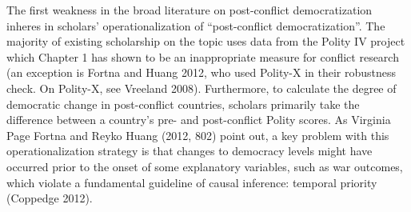 \documentclass [11pt]{article}
\begin{document}


The first weakness in the broad literature on post-conflict democratization inheres in scholars' operationalization of ``post-conflict democratization''. The majority of existing scholarship on the topic uses data from the Polity IV project which Chapter 1 has shown to be an inappropriate measure for conflict research (an exception is Fortna and Huang 2012, who used Polity-X in their robustness check. On Polity-X, see Vreeland 2008). Furthermore, to calculate the degree of democratic change in post-conflict countries, scholars primarily take the difference between a country's pre- and post-conflict Polity scores. As Virginia Page Fortna and Reyko Huang (2012, 802) point out, a key problem with this operationalization strategy is that changes to democracy levels might have occurred prior to the onset of some explanatory variables, such as war outcomes, which violate a fundamental guideline of causal inference: temporal priority (Coppedge 2012).
\end{document}
